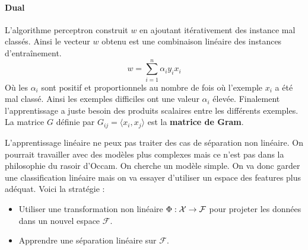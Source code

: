 \paragraph{Dual}
L'algorithme perceptron construit $w$ en ajoutant itérativement des instance mal classés. Ainsi le vecteur $w$ obtenu est une combinaison linéaire des instances d'entraînement.
$$ w = \sum_{i=1}^n \alpha_i y_i x_i $$
Où les $\alpha_i$ sont positif et proportionnels au nombre de fois où l'exemple $x_i$ a été mal classé. Ainsi les exemples difficiles ont une valeur $\alpha_i$ élevée. Finalement l'apprentissage a juste besoin des produits scalaires entre les différents exemples. La matrice $G$ définie par {\boldmath $G_{ij} = \langle x_i, x_j \rangle$} est la \textbf{matrice de Gram}.


L'apprentissage linéaire ne peux pas traiter des cas de séparation non linéaire. On pourrait travailler avec des modèles plus complexes mais ce n'est pas dans la philosophie du rasoir d'Occam. On cherche un modèle simple. On va donc garder une classification linéaire mais on va essayer d'utiliser un espace des features plus adéquat. Voici la stratégie :
\begin{itemize}
	\item Utiliser une transformation non linéaire $\Phi : \mathcal{X} \rightarrow \mathcal{F}$ pour projeter les données dans un nouvel espace $\mathcal{F}$.
	\item Apprendre une séparation linéaire sur $\mathcal{F}$.
\end{itemize}

